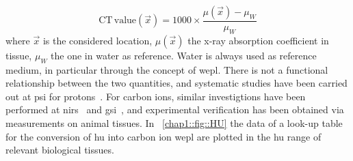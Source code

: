 \begin{equation}
\mathrm{CT\,value}(\vec{x}) =1000 \times \frac{\mu (\vec{x})-\mu_{W}}{\mu_{W}}
\label{chap1::eq::HU}
\end{equation}
where $\vec{x}$ is the considered location, $\mu(\vec{x})$ the x-ray absorption coefficient in tissue, $\mu_{W}$ the one in water as reference. Water is always used as reference medium, in particular through the concept of \gls{wepl}. There is not a functional relationship between the two quantities, and systematic studies have been carried out at \gls{psi} for protons~\parencite{Schneider1996, Schaffner1998}. For carbon ions, similar investigtions have been performed at \gls{nirs}~\parencite{Matsufuji1998, Kanematsu2003} and \gls{gsi}~\parencite{Jakel2001, Rietzel2007}, and experimental verification has been obtained via measurements on animal tissues. In \figurename~\ref{chap1::fig::HU} the data of a look-up table for the conversion of \gls{hu} into carbon ion \gls{wepl} are plotted in the \gls{hu} range of relevant biological tissues.

